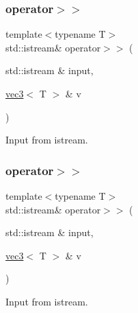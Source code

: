 \subsubsection{\texorpdfstring{operator$>$$>$}{operator>>}\hspace{0.1cm}{\footnotesize\ttfamily [2/4]}}
{\footnotesize\ttfamily template$<$typename T$>$ \\
std\+::istream\& operator$>$$>$ (\begin{DoxyParamCaption}\item[{std\+::istream \&}]{input,  }\item[{\mbox{\hyperlink{struct_space_h_1_1vec3}{vec3}}$<$ T $>$ \&}]{v }\end{DoxyParamCaption})\hspace{0.3cm}{\ttfamily [friend]}}



Input from istream. 

\mbox{\label{struct_space_h_1_1vec3_a72f92578884bd68e0747871acd8545fd}} 
\subsubsection{\texorpdfstring{operator$>$$>$}{operator>>}\hspace{0.1cm}{\footnotesize\ttfamily [3/4]}}
{\footnotesize\ttfamily template$<$typename T$>$ \\
std\+::istream\& operator$>$$>$ (\begin{DoxyParamCaption}\item[{std\+::istream \&}]{input,  }\item[{\mbox{\hyperlink{struct_space_h_1_1vec3}{vec3}}$<$ T $>$ \&}]{v }\end{DoxyParamCaption})\hspace{0.3cm}{\ttfamily [friend]}}



Input from istream. 

\mbox{\label{struct_space_h_1_1vec3_a72f92578884bd68e0747871acd8545fd}} 
